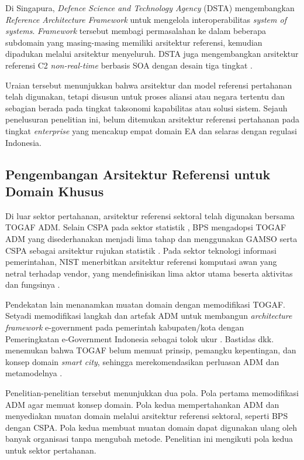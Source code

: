 Di Singapura, \textit{Defence Science and Technology Agency} (DSTA\label{sk:DSTA}) mengembangkan \textit{Reference Architecture Framework} untuk mengelola interoperabilitas \textit{system of systems}. \textit{Framework} tersebut membagi permasalahan ke dalam beberapa subdomain yang masing-masing memiliki arsitektur referensi, kemudian dipadukan melalui arsitektur menyeluruh. DSTA juga mengembangkan arsitektur referensi C2 \textit{non-real-time} berbasis SOA dengan desain tiga tingkat \cite{Chang2009}.

Uraian tersebut menunjukkan bahwa arsitektur dan model referensi pertahanan telah digunakan, tetapi disusun untuk proses aliansi atau negara tertentu dan sebagian berada pada tingkat taksonomi kapabilitas atau solusi sistem. Sejauh penelusuran penelitian ini, belum ditemukan arsitektur referensi pertahanan pada tingkat \textit{enterprise} yang mencakup empat domain EA dan selaras dengan regulasi Indonesia.

\subsection{Pengembangan Arsitektur Referensi untuk Domain Khusus}
\label{sec:II.8.3}

Di luar sektor pertahanan, arsitektur referensi sektoral telah digunakan bersama TOGAF ADM. Selain CSPA pada sektor statistik \cite{UNECECSPA2014}, BPS\label{sk:BPS} mengadopsi TOGAF ADM yang disederhanakan menjadi lima tahap dan menggunakan GAMSO\label{sk:GAMSO} serta CSPA sebagai arsitektur rujukan statistik \cite{Virantina2020}. Pada sektor teknologi informasi pemerintahan, NIST\label{sk:NIST} menerbitkan arsitektur referensi komputasi awan yang netral terhadap vendor, yang mendefinisikan lima aktor utama beserta aktivitas dan fungsinya \cite{NISTCCRA2011}.

Pendekatan lain menanamkan muatan domain dengan memodifikasi TOGAF. Setyadi memodifikasi langkah dan artefak ADM untuk membangun \textit{architecture framework} e-government pada pemerintah kabupaten/kota dengan Pemeringkatan e-Government Indonesia sebagai tolok ukur \cite{Setyadi2015}. Bastidas dkk. menemukan bahwa TOGAF belum memuat prinsip, pemangku kepentingan, dan konsep domain \textit{smart city}, sehingga merekomendasikan perluasan ADM dan metamodelnya \cite{Bastidas2023}.

Penelitian-penelitian tersebut menunjukkan dua pola. Pola pertama memodifikasi ADM agar memuat konsep domain. Pola kedua mempertahankan ADM dan menyediakan muatan domain melalui arsitektur referensi sektoral, seperti BPS dengan CSPA. Pola kedua membuat muatan domain dapat digunakan ulang oleh banyak organisasi tanpa mengubah metode. Penelitian ini mengikuti pola kedua untuk sektor pertahanan.

